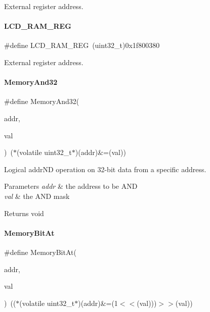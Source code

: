 External register address. \mbox{\label{a00020_a09e3b2dc0284d0ad190df03fc438bc46}} 
\paragraph{\texorpdfstring{L\+C\+D\+\_\+\+R\+A\+M\+\_\+\+R\+EG}{LCD\_RAM\_REG}}
{\footnotesize\ttfamily \#define L\+C\+D\+\_\+\+R\+A\+M\+\_\+\+R\+EG~(uint32\+\_\+t)0x1f800380}

External register address. \mbox{\label{a00020_ad87cedffcaadc51db22594fce55173d4}} 
\paragraph{\texorpdfstring{Memory\+And32}{MemoryAnd32}}
{\footnotesize\ttfamily \#define Memory\+And32(\begin{DoxyParamCaption}\item[{}]{addr,  }\item[{}]{val }\end{DoxyParamCaption})~($\ast$(volatile uint32\+\_\+t$\ast$)(addr)\&=(val))}



Logical addr\+ND operation on 32-\/bit data from a specific address. 


\begin{DoxyParams}{Parameters}
{\em addr} & the address to be A\+ND \\
\hline
{\em val} & the A\+ND mask \\
\hline
\end{DoxyParams}
\begin{DoxyReturn}{Returns}
void 
\end{DoxyReturn}
\mbox{\label{a00020_afc530c7e6b49b0ca97c1ad9dac1c4750}} 
\paragraph{\texorpdfstring{Memory\+Bit\+At}{MemoryBitAt}}
{\footnotesize\ttfamily \#define Memory\+Bit\+At(\begin{DoxyParamCaption}\item[{}]{addr,  }\item[{}]{val }\end{DoxyParamCaption})~(($\ast$(volatile uint32\+\_\+t$\ast$)(addr)\&=(1$<$$<$(val)))$>$$>$(val))}



